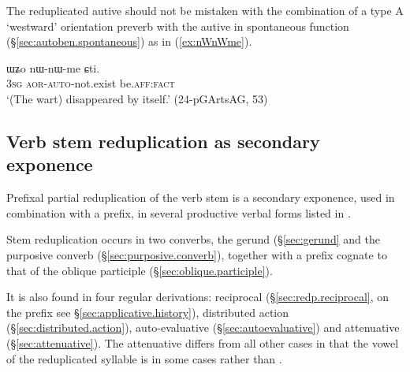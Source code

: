 The reduplicated autive should not be mistaken with the combination of a type A `westward' orientation preverb  with the autive in spontaneous function (§\ref{sec:autoben.spontaneous})  as in (\ref{ex:nWnWme}).

\begin{exe}
\ex \label{ex:nWnWme}
\gll ɯʑo nɯ-nɯ-me ɕti. \\
\textsc{3sg} \textsc{aor}-\textsc{auto}-not.exist be.\textsc{aff}:\textsc{fact} \\
\glt `(The wart) disappeared by itself.' (24-pGArtsAG, 53)
\end{exe}
\subsection{Verb stem reduplication as secondary exponence} \label{sec:verb.stem.redp}
Prefixal partial reduplication of the verb stem is a secondary exponence, used in combination with a prefix, in several productive verbal forms listed in . 

Stem reduplication occurs in two converbs, the gerund (§\ref{sec:gerund} and the purposive converb (§\ref{sec:purposive.converb}), together with a  prefix cognate to that of the oblique participle (§\ref{sec:oblique.participle}).

It is also found in four regular derivations: reciprocal (§\ref{sec:redp.reciprocal}, on the  prefix see §\ref{sec:applicative.history}), distributed action (§\ref{sec:distributed.action}), auto-evaluative (§\ref{sec:autoevaluative}) and attenuative (§\ref{sec:attenuative}). The attenuative differs from all other cases in that the vowel of the reduplicated syllable is in some cases  rather than .

